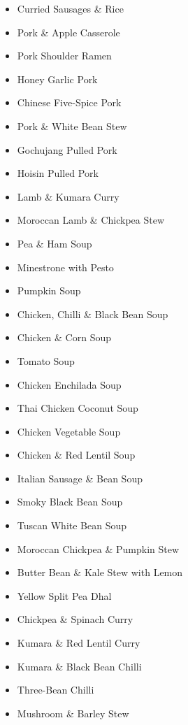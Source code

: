 \begin{itemize}
  \item \todo Curried Sausages \& Rice
  \item \todo Pork \& Apple Casserole
  \item \todo Pork Shoulder Ramen
  \item \todo Honey Garlic Pork
  \item \todo Chinese Five-Spice Pork
  \item \todo Pork \& White Bean Stew
  \item \todo Gochujang Pulled Pork 
  \item \todo Hoisin Pulled Pork
  \item \todo Lamb \& Kumara Curry
  \item \todo Moroccan Lamb \& Chickpea Stew
\end{itemize}

\begin{itemize}
  \item \todo Pea \& Ham Soup 
  \item \todo Minestrone with Pesto
  \item \todo Pumpkin Soup
  \item \todo Chicken, Chilli \& Black Bean Soup
  \item \todo Chicken \& Corn Soup
  \item \todo Tomato Soup
  \item \todo Chicken Enchilada Soup
  \item \todo Thai Chicken Coconut Soup
  \item \todo Chicken Vegetable Soup
  \item \todo Chicken \& Red Lentil Soup
  \item \todo Italian Sausage \& Bean Soup
  \item \todo Smoky Black Bean Soup
  \item \todo Tuscan White Bean Soup
\end{itemize}

\begin{itemize}
  \item \todo Moroccan Chickpea \& Pumpkin Stew
  \item \todo Butter Bean \& Kale Stew with Lemon
  \item \todo Yellow Split Pea Dhal 
  \item \todo Chickpea \& Spinach Curry
  \item \todo Kumara \& Red Lentil Curry
  \item \todo Kumara \& Black Bean Chilli
  \item \todo Three-Bean Chilli
  \item \todo Mushroom \& Barley Stew
\end{itemize}
